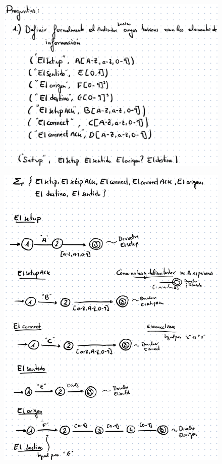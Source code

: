 \documentclass[12pt, twoside, openright]{report} %
\begin{document}
\begin{figure}[H]
	{\includegraphics[scale=.2]{image-20210305192648153.png}}
\end{figure}

\begin{figure}[H]
	{\includegraphics[scale=.25]{image-20210305192718592.png}}
\end{figure}
\end{document}
